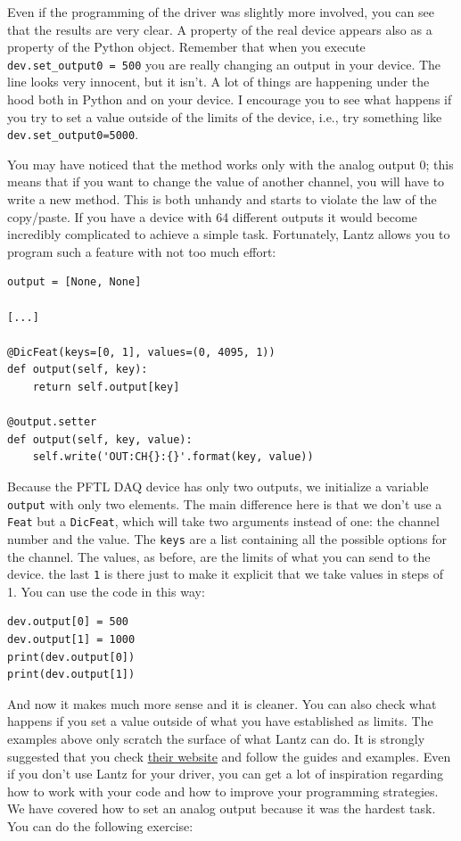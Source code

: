 Even if the programming of the driver was slightly more involved, you
can see that the results are very clear. A property of the real device
appears also as a property of the Python object. Remember that when you
execute \texttt{dev.set_output0 = 500} you are really changing an
output in your device. The line looks very innocent, but it isn't. A lot
of things are happening under the hood both in Python and on your
device. I encourage you to see what happens if you try to set a value
outside of the limits of the device, i.e., try something like
\texttt{dev.set_output0=5000}.

You may have noticed that the method works only with the analog output
0; this means that if you want to change the value of another channel,
you will have to write a new method. This is both unhandy and starts to
violate the law of the copy/paste. If you have a device with 64
different outputs it would become incredibly complicated to achieve a
simple task. Fortunately, Lantz allows you to program such a feature
with not too much effort:

\begin{verbatim}
output = [None, None]

[...]

@DicFeat(keys=[0, 1], values=(0, 4095, 1))
def output(self, key):
    return self.output[key]

@output.setter
def output(self, key, value):
    self.write('OUT:CH{}:{}'.format(key, value))
\end{verbatim}

Because the {PFTL DAQ} device has only two outputs, we initialize a
variable \texttt{output} with only two elements. The main difference
here is that we don't use a \texttt{Feat} but a \texttt{DicFeat}, which
will take two arguments instead of one: the channel number and the
value. The \texttt{keys} are a list containing all the possible options
for the channel. The
values, as before, are the limits of what you can send to the device. 
the last \texttt{1} is there just to make it explicit that we take
values in steps of 1. You can use the code in this way:

\begin{verbatim}
dev.output[0] = 500
dev.output[1] = 1000
print(dev.output[0])
print(dev.output[1])
\end{verbatim}

And now it makes much more sense and it is cleaner. You can also check
what happens if you set a value outside of what you have established as
limits. The examples above only scratch the surface of what Lantz can
do. It is strongly suggested that you check
\href{http://lantz.readthedocs.io}{their website} and follow the guides
and examples. Even if you don't use Lantz for your driver, you can get a
lot of inspiration regarding how to work with your code and how to
improve your programming strategies. We have covered how to set an
analog output because it was the hardest task. You can do the
following exercise:

